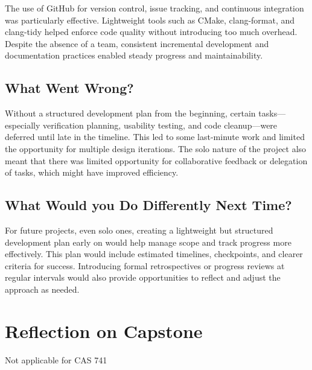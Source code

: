 \documentclass{article}
\begin{document}

The use of GitHub for version control, issue tracking, and continuous
integration was particularly effective. Lightweight tools such as CMake,
clang-format, and clang-tidy helped enforce code quality without introducing too
much overhead. Despite the absence of a team, consistent incremental development
and documentation practices enabled steady progress and maintainability.

\subsection{What Went Wrong?}


Without a structured development plan from the beginning, certain
tasks—especially verification planning, usability testing, and code cleanup—were
deferred until late in the timeline. This led to some last-minute work and
limited the opportunity for multiple design iterations. The solo nature of the
project also meant that there was limited opportunity for collaborative feedback
or delegation of tasks, which might have improved efficiency.

\subsection{What Would you Do Differently Next Time?}


For future projects, even solo ones, creating a lightweight but structured
development plan early on would help manage scope and track progress more
effectively. This plan would include estimated timelines, checkpoints, and
clearer criteria for success. Introducing formal retrospectives or progress
reviews at regular intervals would also provide opportunities to reflect and
adjust the approach as needed.

\section{Reflection on Capstone}

Not applicable for CAS 741

\end{document}

